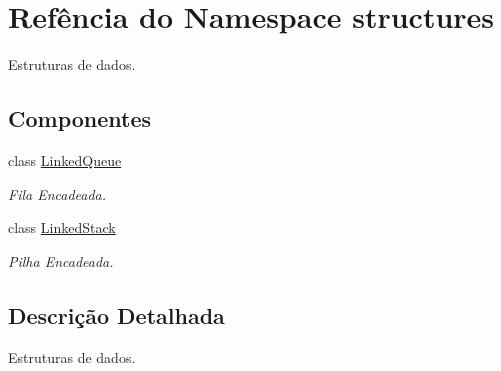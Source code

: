 \hypertarget{namespacestructures}{}\section{Refência do Namespace structures}
\label{namespacestructures}


Estruturas de dados.  


\subsection*{Componentes}
\begin{DoxyCompactItemize}
\item 
class \hyperlink{classstructures_1_1LinkedQueue}{Linked\+Queue}
\begin{DoxyCompactList}\small\item\em Fila Encadeada. \end{DoxyCompactList}\item 
class \hyperlink{classstructures_1_1LinkedStack}{Linked\+Stack}
\begin{DoxyCompactList}\small\item\em Pilha Encadeada. \end{DoxyCompactList}\end{DoxyCompactItemize}


\subsection{Descrição Detalhada}
Estruturas de dados. 